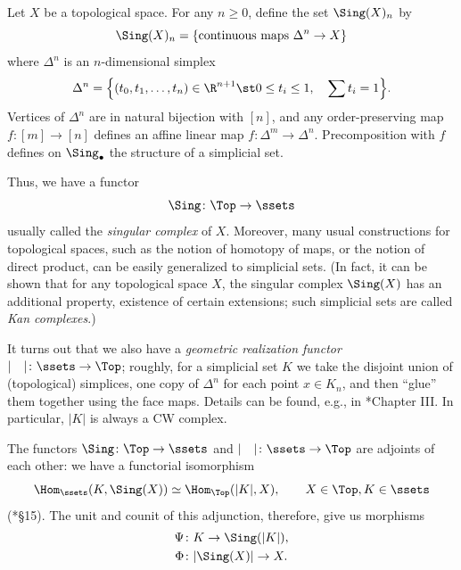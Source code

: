 \begin{example}\label{x:top-sset}
  Let $X$ be a topological space. For any $n\ge 0$, define the set
  $\Sing(X)_n$ by
  $$
    \Sing(X)_n= \{\text{continuous maps }\Delta^n\to X\}
  $$
  where $\Delta^n$ is an $n$-dimensional simplex
  \begin{equation}\label{e:simplex}
    \Delta^n=\Bigl\{
              (t_0, t_1, \dots, t_n)\in \R^{n+1}\st
              0\le t_i \le 1, \quad \sum t_i=1
             \Bigr\}.
  \end{equation}
  Vertices of $\Delta^n$ are in natural bijection with $[n]$, and any
  order-preserving map $f\colon [m]\to [n]$ defines an affine linear
  map $f\colon \Delta^m \to \Delta^n$. Precomposition with $f$ defines on
  $\Sing_\bullet$ the structure of a simplicial set.
\end{example}
Thus, we have a functor
$$
  \Sing\colon \Top \to \ssets
$$
usually called the \emph{singular complex} of $X$.
Moreover, many usual constructions for topological spaces, such as the notion of
homotopy of maps, or the notion of direct product, can be easily generalized to
simplicial sets. (In fact, it can be shown that for any topological space $X$,
the singular complex $\Sing(X)$ has an additional property, existence of
certain extensions; such simplicial sets are called \emph{Kan complexes}.)

It turns out that we also have a \emph{geometric realization
functor} $|\quad|\colon \ssets\to \Top$;
roughly, for a simplicial set $K$ we take the disjoint union of (topological)
simplices, one copy of $\Delta^n$ for each point $x\in K_n$, and then ``glue''
them together using the face maps. Details can be found, e.g., in
*{Chapter III}. In particular, $|K|$ is always a CW complex.

The functors $\Sing\colon \Top\to \ssets$ and $|\quad|\colon \ssets\to \Top$ are
adjoints of each other: we have a functorial isomorphism
$$
  \Hom_{\ssets}(K, \Sing(X))\simeq \Hom_{\Top}(|K|, X),
  \qquad X\in \Top, K\in \ssets
$$
(*{\S 15}). The unit and counit of this adjunction, therefore,
give us morphisms
\begin{align*}
  \Psi&\colon K\to \Sing(|K|),\\
  \Phi&\colon |\Sing(X)|\to X.
\end{align*}

